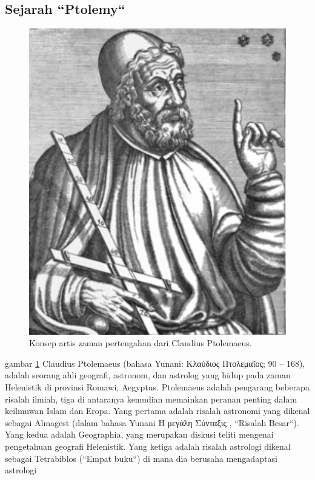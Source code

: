 \subsection{Sejarah ``Ptolemy``}
	\begin{figure} [ht]
	\centerline{\includegraphics[width=1\textwidth]{figures/Ptolemyporg.PNG}}
	\caption{Konsep artis zaman pertengahan dari Claudius Ptolemaeus.}
	\label{Ptolemyporg}
	\end{figure}
    gambar \ref{Ptolemyporg} Claudius Ptolemaeus (bahasa Yunani: Κλαύδιος Πτολεμαῖος; 90 – 168), adalah seorang ahli geografi, astronom,
    dan astrolog yang hidup pada zaman Helenistik di provinsi Romawi, Aegyptus.
    Ptolemaeus adalah pengarang beberapa risalah ilmiah, tiga di antaranya kemudian memainkan peranan penting dalam keilmuwan Islam 
    dan Eropa. Yang pertama adalah risalah astronomi yang dikenal sebagai Almagest (dalam bahasa Yunani Η μεγάλη Σύνταξις , 
    ``Risalah Besar``). Yang kedua adalah Geographia, yang merupakan diskusi teliti mengenai pengetahuan geografi Helenistik. 
    Yang ketiga adalah risalah astrologi dikenal sebagai Tetrabiblos (``Empat buku``) di mana dia berusaha mengadaptasi astrologi 
